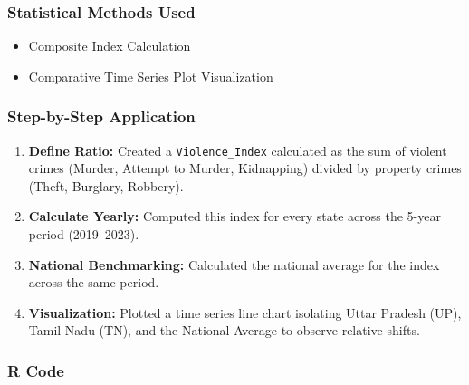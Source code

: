 \documentclass[
]{article}
\providecommand{\tightlist}{%
  \setlength{\itemsep}{0pt}\setlength{\parskip}{0pt}}
\begin{document}
\subsubsection{Statistical Methods Used}\label{statistical-methods-used}

\begin{itemize}
\tightlist
\item
  Composite Index Calculation
\item
  Comparative Time Series Plot Visualization
\end{itemize}

\subsubsection{Step-by-Step Application}\label{step-by-step-application}

\begin{enumerate}
\def\labelenumi{\arabic{enumi}.}
\tightlist
\item
  \textbf{Define Ratio:} Created a \texttt{Violence\_Index} calculated
  as the sum of violent crimes (Murder, Attempt to Murder, Kidnapping)
  divided by property crimes (Theft, Burglary, Robbery).
\item
  \textbf{Calculate Yearly:} Computed this index for every state across
  the 5-year period (2019--2023).
\item
  \textbf{National Benchmarking:} Calculated the national average for
  the index across the same period.
\item
  \textbf{Visualization:} Plotted a time series line chart isolating
  Uttar Pradesh (UP), Tamil Nadu (TN), and the National Average to
  observe relative shifts.
\end{enumerate}

\subsubsection{R Code}\label{r-code}
\end{document}
